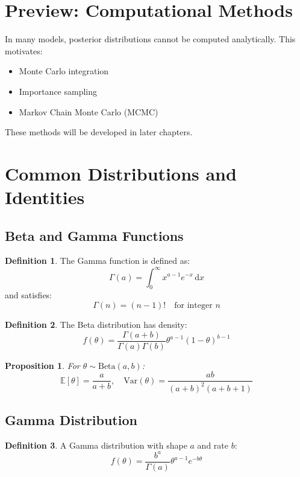 \documentclass[12pt,oneside]{book}
\numberwithin{equation}{section}
\theoremstyle{definition}
\newtheorem{definition}{Definition}[section]
\theoremstyle{plain}
\newtheorem{proposition}{Proposition}[section]
\theoremstyle{remark}
\newcommand{\E}{\mathbb{E}}
\newcommand{\Var}{\mathrm{Var}}
\newcommand{\dd}{\,\mathrm{d}}
\newcommand{\BetaDist}{\mathrm{Beta}}
\begin{document}
\section{Preview: Computational Methods}

In many models, posterior distributions cannot be computed analytically. This motivates:

\begin{itemize}
    \item Monte Carlo integration
    \item Importance sampling
    \item Markov Chain Monte Carlo (MCMC)
\end{itemize}

These methods will be developed in later chapters.

\section{Common Distributions and Identities}

\subsection{Beta and Gamma Functions}

\begin{definition}
The Gamma function is defined as:
$$
\Gamma(a) = \int_0^\infty x^{a-1} e^{-x} \dd x
$$
and satisfies:
$$
\Gamma(n) = (n-1)! \quad \text{for integer } n
$$
\end{definition}

\begin{definition}
The Beta distribution has density:
$$
f(\theta) = \frac{\Gamma(a+b)}{\Gamma(a)\Gamma(b)} \theta^{a-1}(1-\theta)^{b-1}
$$
\end{definition}

\begin{proposition}
For $\theta \sim \BetaDist(a,b)$:
$$
\E[\theta] = \frac{a}{a+b}, \quad 
\Var(\theta) = \frac{ab}{(a+b)^2(a+b+1)}
$$
\end{proposition}

\subsection{Gamma Distribution}

\begin{definition}
A Gamma distribution with shape $a$ and rate $b$:
$$
f(\theta) = \frac{b^a}{\Gamma(a)} \theta^{a-1} e^{-b\theta}
$$
\end{definition}
\end{document}
